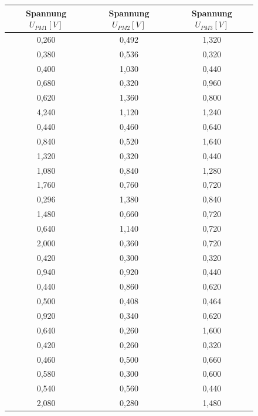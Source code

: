                 \begin{figure}[htbp]
                    \tiny\centering
                    \begin{tabular}{c|c|c}
                        Spannung $U_{PM1} [\unit{V}]$ & Spannung $U_{PM2} [\unit{V}]$ & Spannung $U_{PM3} [\unit{V}]$ \\ 
                        \hline       0,260 & 0,492 & 1,320\\
                        0,380 & 0,536 & 0,320\\
                        0,400 & 1,030 & 0,440\\
                        0,680 & 0,320 & 0,960\\
                        0,620 & 1,360 & 0,800\\
                        4,240 & 1,120 & 1,240\\
                        0,440 & 0,460 & 0,640\\
                        0,840 & 0,520 & 1,640\\
                        1,320 & 0,320 & 0,440\\
                        1,080 & 0,840 & 1,280\\
                        1,760 &	0,760 & 0,720\\
                        0,296 & 1,380 & 0,840\\
                        1,480 & 0,660 & 0,720\\
                        0,640 & 1,140 & 0,720\\
                        2,000 & 0,360 & 0,720\\
                        0,420 & 0,300 & 0,320\\
                        0,940 & 0,920 & 0,440\\
                        0,440 & 0,860 & 0,620\\
                        0,500 & 0,408 & 0,464\\
                        0,920 & 0,340 & 0,620\\
                        0,640 & 0,260 & 1,600\\
                        0,420 & 0,260 & 0,320\\
                        0,460 & 0,500 & 0,660\\
                        0,580 & 0,300 & 0,600\\
                        0,540 & 0,560 & 0,440\\
                        2,080 & 0,280 & 1,480\\

\end{tabular}
\end{figure}
